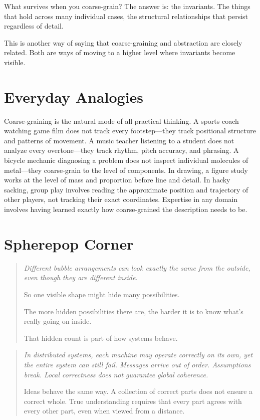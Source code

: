\documentclass[11pt]{book}
\theoremstyle{definition}
\theoremstyle{remark}
\newenvironment{literaryaside}
  {\begin{quote}\small\itshape}
  {\end{quote}}
\newenvironment{spherepopjunior}
  {\begin{quote}\small\itshape}
  {\end{quote}}
\begin{document}
What survives when you coarse-grain? The answer is: the invariants. The
things that hold across many individual cases, the structural relationships
that persist regardless of detail.

This is another way of saying that coarse-graining and abstraction are
closely related. Both are ways of moving to a higher level where invariants
become visible.

\section*{Everyday Analogies}

Coarse-graining is the natural mode of all practical thinking. A sports
coach watching game film does not track every footstep---they track
positional structure and patterns of movement. A music teacher listening
to a student does not analyze every overtone---they track rhythm, pitch
accuracy, and phrasing. A bicycle mechanic diagnosing a problem does
not inspect individual molecules of metal---they coarse-grain to the
level of components. In drawing, a figure study works at the level of
mass and proportion before line and detail. In hacky sacking, group
play involves reading the approximate position and trajectory of other
players, not tracking their exact coordinates. Expertise in any domain
involves having learned exactly how coarse-grained the description
needs to be.

\section*{Spherepop Corner}

\begin{spherepopjunior}
Different bubble arrangements can look exactly the same from the outside,
even though they are different inside.

So one visible shape might hide many possibilities.

The more hidden possibilities there are, the harder it is to know
what's really going on inside.

That hidden count is part of how systems behave.
\end{spherepopjunior}

\begin{literaryaside}
In distributed systems, each machine may operate correctly on its own,
yet the entire system can still fail. Messages arrive out of order.
Assumptions break. Local correctness does not guarantee global coherence.

Ideas behave the same way. A collection of correct parts does not ensure
a correct whole. True understanding requires that every part agrees with
every other part, even when viewed from a distance.
\end{literaryaside}
\end{document}
